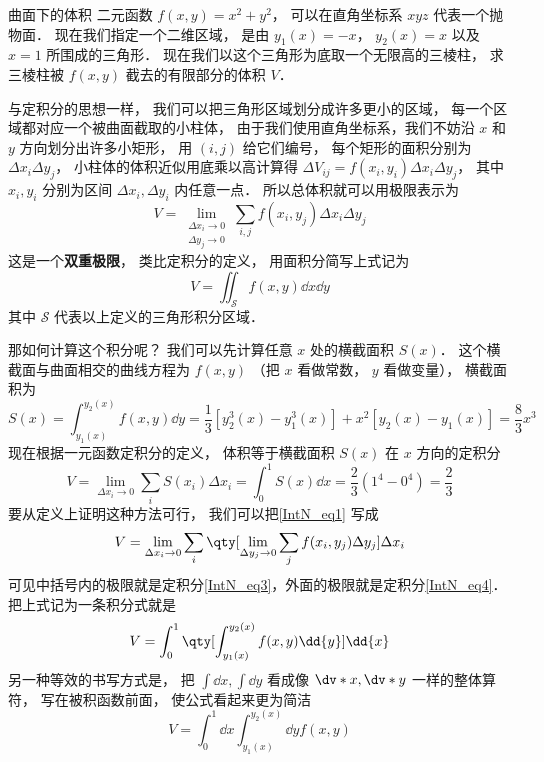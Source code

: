 \begin{example}{曲面下的体积}\label{IntN_ex1}
二元函数 $f(x,y) = x^2 + y^2$， 可以在直角坐标系 $xyz$ 代表一个抛物面． 现在我们指定一个二维区域， 是由 $y_1(x) = -x$， $y_2(x) = x$ 以及 $x = 1$ 所围成的三角形． 现在我们以这个三角形为底取一个无限高的三棱柱， 求三棱柱被 $f(x,y)$ 截去的有限部分的体积 $V$．

与定积分的思想一样， 我们可以把三角形区域划分成许多更小的区域， 每一个区域都对应一个被曲面截取的小柱体， 由于我们使用直角坐标系，我们不妨沿 $x$ 和 $y$ 方向划分出许多小矩形， 用 $(i,j)$ 给它们编号， 每个矩形的面积分别为 $\Delta x_i \Delta y_j$， 小柱体的体积近似用底乘以高计算得 $\Delta V_{ij} = f(x_i,y_i) \Delta x_i \Delta y_j$， 其中 $x_i, y_i$ 分别为区间 $\Delta x_i, \Delta y_i$ 内任意一点． 所以总体积就可以用极限表示为
\begin{equation}
V = \lim_{\substack{\Delta x_i\to 0\\ \Delta y_j\to 0}} \sum_{i, j} f(x_i,y_j) \Delta x_i \Delta y_j
\end{equation}
这是一个\textbf{双重极限}， 类比定积分的定义， 用面积分简写上式记为
\begin{equation}
V = \iint_{\mathcal{S}} f(x,y) \dd{x}\dd{y}
\end{equation}
其中 $\mathcal{S}$ 代表以上定义的三角形积分区域． 

那如何计算这个积分呢？ 我们可以先计算任意 $x$ 处的横截面积 $S(x)$． 这个横截面与曲面相交的曲线方程为 $f(x,y)$ （把 $x$ 看做常数， $y$ 看做变量）， 横截面积为
\begin{equation}\label{IntN_eq3}
S(x) = \int_{y_1(x)}^{y_2(x)} f(x,y) \dd{y} = \frac13 [y_2^3(x) - y_1^3(x)] + x^2[y_2(x) - y_1(x)] = \frac83 x^3
\end{equation}
现在根据一元函数定积分的定义， 体积等于横截面积 $S(x)$ 在 $x$ 方向的定积分
\begin{equation}\label{IntN_eq4}
V = \lim_{\Delta x_i\to 0} \sum_{i} S(x_i) \Delta x_i = \int_0^1 S(x) \dd{x} = \frac23 (1^4 -0^4) = \frac23
\end{equation}
要从定义上证明这种方法可行， 我们可以把\autoref{IntN_eq1} 写成
\begin{equation}
V = \lim_{\Delta x_i\to 0} \sum_{i} \qty[\lim_{\Delta y_j\to 0}\sum_{j} f(x_i,y_j) \Delta y_j ] \Delta x_i
\end{equation}
可见中括号内的极限就是定积分\autoref{IntN_eq3}，外面的极限就是定积分\autoref{IntN_eq4}． 把上式记为一条积分式就是
\begin{equation}
V = \int_0^1 \qty[\int_{y_1(x)}^{y_2(x)} f(x,y) \dd{y}] \dd{x}
\end{equation}
另一种等效的书写方式是， 把 $\int \dd{x}, \int \dd{y}$ 看成像 $\dv*{x}, \dv*{y}$ 一样的整体算符， 写在被积函数前面， 使公式看起来更为简洁
\begin{equation}\label{IntN_eq7}
V = \int_0^1 \dd{x} \int_{y_1(x)}^{y_2(x)} \dd{y} f(x,y)
\end{equation}
\end{example}

